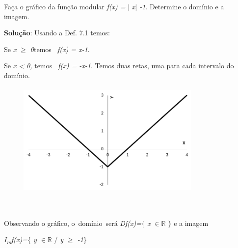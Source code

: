 \begin{texemplo}

Faça o gráfico da função modular \textit{f(x) =} $ \vert $ \textit{x$ \vert $ -1}. Determine o domínio e a imagem.  

\textbf{Solução}: Usando a Def. 7.1 temos:

\quad Se \textit{x $ \geq $  0}temos\textit{~ f(x) = x-1}.

\quad Se \textit{x < 0, }temos\textit{~ f(x) = -x-1}. Temos duas retas, uma para cada intervalo do domínio.

\begin{figure}[H]
	\begin{Center}
		\includegraphics[width=3.55in,height=2.24in]{capitulos/outras_funcoes/media/image32.pdf}
	\end{Center}
\end{figure}

~~

\quad Observando o gráfico, o~domínio~será   \textit{Df(x)=$ \{ $ x $ \in \mathbb{R} $  \textbf{ }$ \} $ } e a imagem

\quad \textit{I\textsubscript{m}f(x)=$ \{ $ y $ \in \mathbb{R} $  }/ \textit{y $ \geq $  -1$ \} $ } \qedsymbol{}
\end{texemplo}

